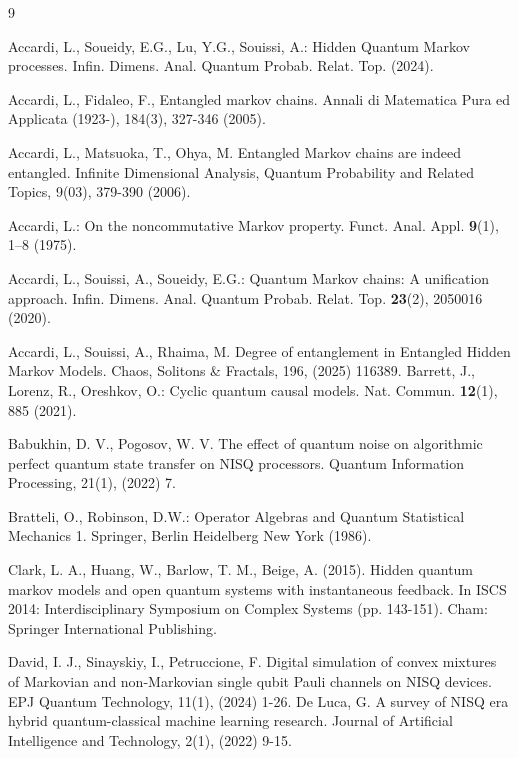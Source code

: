 \documentclass[11pt, reco]{article}
\begin{document}
\begin{thebibliography}{9}

Accardi, L., Soueidy, E.G., Lu, Y.G., Souissi, A.:
Hidden Quantum Markov processes.
Infin. Dimens. Anal. Quantum Probab. Relat. Top. (2024).

 Accardi, L.,   Fidaleo, F.,  Entangled markov chains. Annali di Matematica Pura ed Applicata (1923-), 184(3), 327-346 (2005).

 Accardi, L., Matsuoka, T.,   Ohya, M.  Entangled Markov chains are indeed entangled. Infinite Dimensional Analysis, Quantum Probability and Related Topics, 9(03), 379-390 (2006).

Accardi, L.:
On the noncommutative Markov property.
Funct. Anal. Appl. \textbf{9}(1), 1–8 (1975).

Accardi, L., Souissi, A., Soueidy, E.G.:
Quantum Markov chains: A unification approach.
Infin. Dimens. Anal. Quantum Probab. Relat. Top. \textbf{23}(2), 2050016 (2020).

 Accardi, L., Souissi, A.,   Rhaima, M.  Degree of entanglement in Entangled Hidden Markov Models. Chaos, Solitons \& Fractals, 196,  (2025) 116389.
Barrett, J., Lorenz, R., Oreshkov, O.:
Cyclic quantum causal models.
Nat. Commun. \textbf{12}(1), 885 (2021).

 Babukhin, D. V.,   Pogosov, W. V.  The effect of quantum noise on algorithmic perfect quantum state transfer on NISQ processors. Quantum Information Processing, 21(1), (2022) 7.

Bratteli, O., Robinson, D.W.:
Operator Algebras and Quantum Statistical Mechanics 1.
Springer, Berlin Heidelberg New York (1986).

 Clark, L. A., Huang, W., Barlow, T. M.,  Beige, A. (2015). Hidden quantum markov models and open quantum systems with instantaneous feedback. In ISCS 2014: Interdisciplinary Symposium on Complex Systems (pp. 143-151). Cham: Springer International Publishing.


 David, I. J., Sinayskiy, I.,   Petruccione, F. Digital simulation of convex mixtures of Markovian and non-Markovian single qubit Pauli channels on NISQ devices. EPJ Quantum Technology, 11(1),  (2024) 1-26.
  De Luca, G.  A survey of NISQ era hybrid quantum-classical machine learning research. Journal of Artificial Intelligence and Technology, 2(1), (2022) 9-15.


\end{thebibliography}
\end{document}
